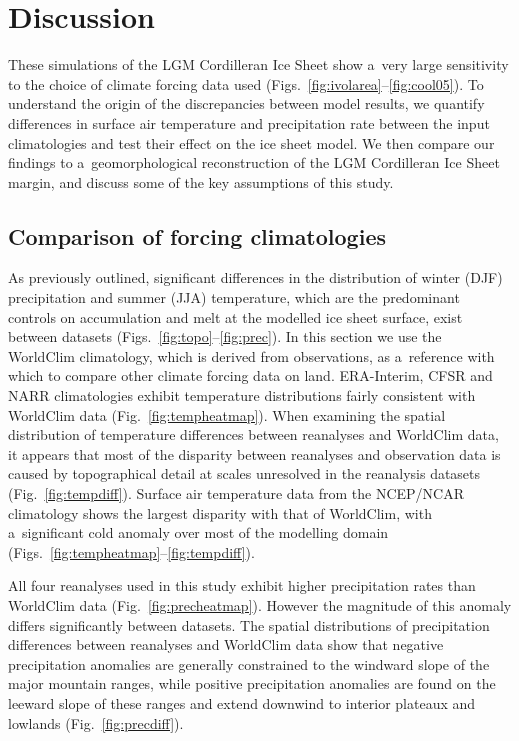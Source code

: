 \documentclass[tc, ms]{copernicus}
\begin{document}
\section{Discussion}
\label{sec:discussion}

These simulations of the LGM Cordilleran Ice Sheet show a~very large sensitivity to the choice of climate forcing data used (Figs.~\ref{fig:ivolarea}--\ref{fig:cool05}). To understand the origin of the discrepancies between model results, we quantify differences in surface air temperature and precipitation rate between the input climatologies and test their effect on the ice sheet model. We then compare our findings to a~geomorphological reconstruction of the LGM Cordilleran Ice Sheet margin, and discuss some of the key assumptions of this study.

\subsection{Comparison of forcing climatologies}

As previously outlined, significant differences in the distribution of winter (DJF) precipitation and summer (JJA) temperature, which are the predominant controls on accumulation and melt at the modelled ice sheet surface, exist between datasets (Figs.~\ref{fig:topo}--\ref{fig:prec}). In this section we use the WorldClim climatology, which is derived from observations, as a~reference with which to compare other climate forcing data on land. ERA-Interim, CFSR and NARR climatologies exhibit temperature distributions fairly consistent with WorldClim data (Fig.~\ref{fig:tempheatmap}). When examining the spatial distribution of temperature differences between reanalyses and WorldClim data, it appears that most of the disparity between reanalyses and observation data is caused by topographical detail at scales unresolved in the reanalysis datasets (Fig.~\ref{fig:tempdiff}). Surface air temperature data from the NCEP/NCAR climatology shows the largest disparity with that of WorldClim, with a~significant cold anomaly over most of the modelling domain (Figs.~\ref{fig:tempheatmap}--\ref{fig:tempdiff}).

All four reanalyses used in this study exhibit higher precipitation rates than WorldClim data (Fig.~\ref{fig:precheatmap}). However the magnitude of this anomaly differs significantly between datasets. The spatial distributions of precipitation differences between reanalyses and WorldClim data show that negative precipitation anomalies are generally constrained to the windward slope of the major mountain ranges, while positive precipitation anomalies are found on the leeward slope of these ranges and extend downwind to interior plateaux and lowlands (Fig.~\ref{fig:precdiff}).
\end{document}
